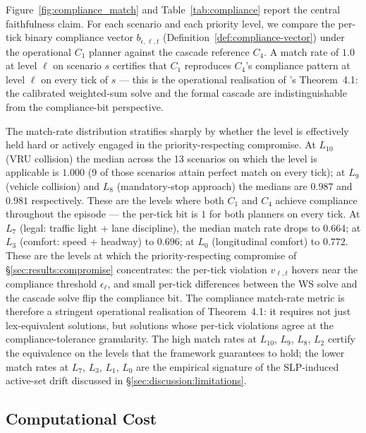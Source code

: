 

Figure~\ref{fig:compliance_match} and Table~\ref{tab:compliance} report the central faithfulness claim. For each scenario and each priority level, we compare the per-tick binary compliance vector $b_{\epsilon, \ell, t}$ (Definition~\ref{def:compliance-vector}) under the operational $C_1$ planner against the cascade reference $C_4$. A match rate of $1.0$ at level $\ell$ on scenario $s$ certifies that $C_1$ reproduces $C_4$'s compliance pattern at level $\ell$ on every tick of $s$ --- this is the operational realisation of \cite{lcp2025}'s Theorem~4.1: the calibrated weighted-sum solve and the formal cascade are indistinguishable from the compliance-bit perspective.

The match-rate distribution stratifies sharply by whether the level is effectively held hard or actively engaged in the priority-respecting compromise. At $L_{10}$ (VRU collision) the median across the 13 scenarios on which the level is applicable is $1.000$ (9 of those scenarios attain perfect match on every tick); at $L_9$ (vehicle collision) and $L_8$ (mandatory-stop approach) the medians are $0.987$ and $0.981$ respectively. These are the levels where both $C_1$ and $C_4$ achieve compliance throughout the episode --- the per-tick bit is $1$ for both planners on every tick. At $L_7$ (legal: traffic light + lane discipline), the median match rate drops to $0.664$; at $L_3$ (comfort: speed + headway) to $0.696$; at $L_0$ (longitudinal comfort) to $0.772$. These are the levels at which the priority-respecting compromise of \S\ref{sec:results:compromise} concentrates: the per-tick violation $v_{\ell, t}$ hovers near the compliance threshold $\epsilon_\ell$, and small per-tick differences between the WS solve and the cascade solve flip the compliance bit. The compliance match-rate metric is therefore a stringent operational realisation of Theorem~4.1: it requires not just lex-equivalent solutions, but solutions whose per-tick violations agree at the compliance-tolerance granularity. The high match rates at $L_{10}$, $L_9$, $L_8$, $L_2$ certify the equivalence on the levels that the framework guarantees to hold; the lower match rates at $L_7$, $L_3$, $L_1$, $L_0$ are the empirical signature of the SLP-induced active-set drift discussed in \S\ref{sec:discussion:limitations}.

\subsection{Computational Cost}
\label{sec:results:cost}


